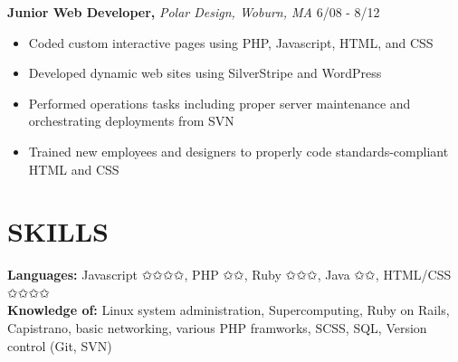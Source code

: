 \documentclass[line, margin]{res}
\begin{document}
\begin{resume}
\begin{itemize}
\end{itemize}
\textbf{Junior Web Developer,} \textit{Polar Design, Woburn, MA} \hfill 6/08 - 8/12
\begin{itemize}
    \item Coded custom interactive pages using PHP, Javascript, HTML, and CSS
    \item Developed dynamic web sites using SilverStripe and WordPress
    \item Performed operations tasks including proper server maintenance and orchestrating deployments from SVN
    \item Trained new employees and designers to properly code standards-compliant HTML and CSS
\end{itemize}

\section{SKILLS}
\textbf{Languages: }Javascript {\dingbats ✩✩✩✩}, PHP {\dingbats ✩✩}, Ruby {\dingbats ✩✩✩}, Java {\dingbats ✩✩}, HTML/CSS {\dingbats ✩✩✩✩} \\
\textbf{Knowledge of: }Linux system administration, Supercomputing, Ruby on Rails, Capistrano, basic networking, various PHP framworks, SCSS, SQL, Version control (Git, SVN)
\end{resume}
\end{document}
